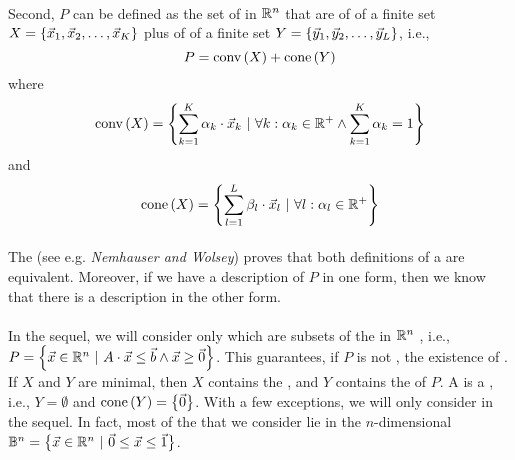 \paragraph{}
Second, $P$ can be defined as the set of  in $\RRR^n$ that are  of  of a finite set $X=\accl{\vec{x}_1,\vec{x}_2,\ldots,\vec{x}_K}$ plus  of  of a finite set $Y=\accl{\vec{y}_1,\vec{y}_2,\ldots,\vec{y}_L}$, i.e.,
\begin{equation}
P=\funm{conv}{X}+\funm{cone}{Y}
\end{equation}
where
\begin{equation}
\funm{conv}{X}=\condset{\sumieqb[k]{1}{K}{\alpha_k\cdot\vec{x}_k}}{\forall k:\alpha_k\in\RRR^+\wedge\sumieqb[k]{1}{K}{\alpha_k}=1}
\end{equation}
and
\begin{equation}
\funm{cone}{X}=\condset{\sumieqb[l]{1}{L}{\beta_l\cdot\vec{x}_l}}{\forall l:\alpha_l\in\RRR^+}
\end{equation}

\paragraph{}
The  (see e.g. \emph{Nemhauser and Wolsey}\cite{citeulike:2212037}) proves that both definitions of a  are equivalent. Moreover, if we have a description of $P$ in one form, then we know that there is a description in the other form.

\paragraph{}
In the sequel, we will consider only  which are subsets of the  in $\RRR^n$ , i.e., $P=\condset{\vec{x}\in\RRR^n}{A\cdot\vec{x}\leq\vec{b}\wedge\vec{x}\geq\vec{0}}$. This guarantees, if $P$ is not , the existence of . If $X$ and $Y$ are minimal, then $X$ contains the , and $Y$ contains the  of $P$. A  is a , i.e., $Y=\emptyset$ and $\funm{cone}{Y}=\accl{\vec{0}}$. With a few exceptions, we will only consider  in the sequel. In fact, most of the  that we consider lie in the $n$-dimensional  $\BBB^n=\condset{\vec{x}\in\RRR^n}{\vec{0}\leq\vec{x}\leq\vec{1}}$.

